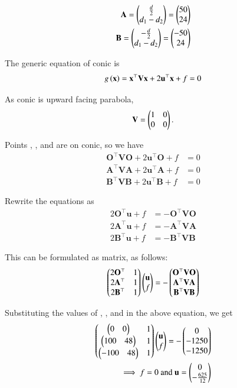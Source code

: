 \documentclass[journal,12pt,twocolumn]{IEEEtran}
\renewcommand{\vec}[1]{\boldsymbol{\mathbf{#1}}}
\begin{document}
\begin{align}
    \vec{A} = \myvec{\frac{d}{2}\\d_1-d_2} = \myvec{50\\24} \\
    \vec{B} = \myvec{-\frac{d}{2}\\d_1-d_2} = \myvec{-50\\24}
\end{align}

The generic equation of conic is
\begin{align}
    g\brak{\vec{x}} = \vec{x}^{\top}\vec{V}\vec{x} + 2\vec{u}^{\top}\vec{x} + f = 0 
\end{align}

As conic is upward facing parabola,
\begin{align}
    \vec{V} = \myvec{1&0\\0&0}.
\end{align}

Points \vec{O}, \vec{A}, and \vec{B} are on conic, so we have
\begin{align}
	\vec{O}^{\top}\vec{V}\vec{O} + 2\vec{u}^{\top}\vec{O} + f &= 0\\
	\vec{A}^{\top}\vec{V}\vec{A} + 2\vec{u}^{\top}\vec{A} + f &= 0\\
	\vec{B}^{\top}\vec{V}\vec{B} + 2\vec{u}^{\top}\vec{B} + f &= 0	 
\end{align}

Rewrite the equations as
\begin{align}
	2\vec{O}^{\top}\vec{u} + f &= - \vec{O}^{\top}\vec{V}\vec{O}\\
	2\vec{A}^{\top}\vec{u} + f &= - \vec{A}^{\top}\vec{V}\vec{A}\\
	2\vec{B}^{\top}\vec{u} + f &= - \vec{B}^{\top}\vec{V}\vec{B}	
\end{align}

This can be formulated as matrix, as follows:
\begin{align}
	\myvec{2\vec{O}^{\top} & 1\\ 2\vec{A}^{\top} & 1\\ 2\vec{B}^{\top} & 1}\myvec{\vec{u} \\ f} = -\myvec{\vec{O}^{\top}\vec{V}\vec{O}\\ \vec{A}^{\top}\vec{V}\vec{A}\\ \vec{B}^{\top}\vec{V}\vec{B}}
\end{align}

Substituting the values of \vec{O}, \vec{A}, and \vec{B} in the above equation, we get
\begin{align}
    \myvec{\myvec{0&0}&1\\ \myvec{100&48}&1\\ \myvec{-100&48}&1}\myvec{\vec{u} \\ f} = -\myvec{0\\-1250\\-1250}\\
    \implies f = 0 \text{ and } \vec{u} = \myvec{0\\-\frac{625}{12}}
\end{align}
\end{document}
